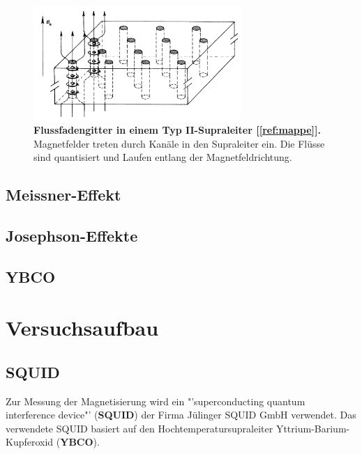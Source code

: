 \documentclass[a4paper,ngerman]{scrartcl}
\begin{document}
\begin{figure}[tb!]
\centering
\includegraphics[width=0.7\textwidth]{abbildungen/typ2_supraleiter.png}
\caption[Versuchsplatz]{\textbf{Flussfadengitter in einem Typ II-Supraleiter [\ref{ref:mappe}].} Magnetfelder treten durch Kanäle in den Supraleiter ein. Die Flüsse sind quantisiert und Laufen entlang der Magnetfeldrichtung.}
\label{fig:typII}
\end{figure}


\subsection{Meissner-Effekt}
\label{ssec:meissner}

\subsection{Josephson-Effekte}
\label{ssec:josephson}


\subsection{YBCO}

 


\section{Versuchsaufbau}

\subsection{SQUID}

Zur Messung der Magnetisierung wird ein "'superconducting quantum interference device"' (\textbf{SQUID}) der Firma Jülinger SQUID GmbH verwendet. 
Das verwendete SQUID basiert auf den Hochtemperatursupraleiter Yttrium-Barium-Kupferoxid (\textbf{YBCO}).
\end{document}
